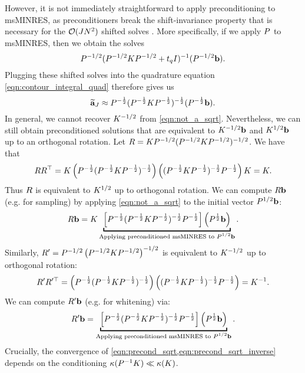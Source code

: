However, it is not immediately straightforward to apply preconditioning to msMINRES, as preconditioners break the shift-invariance property that is necessary for the $\bigo{JN^2}$ shifted solves \cite{jegerlehner1996krylov,aune2013iterative}.
More specifically, if we apply $P$ to msMINRES, then we obtain the solves
%
\[
	P^{-1 / 2} (P^{-1 / 2} K P^{-1 / 2} + t_q I)^{-1} (P^{-1 / 2} \mathbf{b}).
\]
%
Plugging these shifted solves into the quadrature equation \cref{eqn:contour_integral_quad} therefore gives us
%
\begin{equation}
	\widetilde {\mathbf{a}}_J \approx P^{-\frac 1 2} (P^{-\frac 1 2} K P^{-\frac 1 2})^{-\frac 1 2} (P^{-\frac 1 2} \mathbf{b}).
  \label{eqn:not_a_sqrt}
\end{equation}
%
In general, we cannot recover $K^{-1/2}$ from \cref{eqn:not_a_sqrt}.
Nevertheless, we can still obtain preconditioned solutions that are equivalent to $K^{-1/2} \mathbf{b}$ and $K^{1/2} \mathbf{b}$ up to an orthogonal rotation.
Let $R = K P^{-1/2} (P^{-1/2} K P^{-1/2})^{-1/2}$.
We have that
%
\begin{align*}
  R R^\top
	=
	K \left( P^{-\frac 1 2} (P^{-\frac 1 2} K P^{-\frac 1 2})^{-\frac 1 2} \right)
	\left( (P^{-\frac 1 2} K P^{-\frac 1 2})^{-\frac 1 2} P^{-\frac 1 2} \right) K
  = K.
\end{align*}
%
Thus $ R $ is equivalent to $K^{1/2}$ up to orthogonal rotation.
We can compute $R \mathbf{b}$ (e.g. for sampling) by applying \cref{eqn:not_a_sqrt} to the initial vector $P^{1/2} \mathbf{b}$:
%
\begin{align}
  \bR \bb
  =
  \bK
  \underbracket{%
    \Bigl[ \bP^{-\frac 1 2} (\bP^{-\frac 1 2} \bK \bP^{-\frac 1 2})^{-\frac 1 2} \bP^{-\frac 1 2} \Bigr]
    \left( \bP^{\frac 1 2} \bb \right)
  }_{\text{Applying preconditioned msMINRES to $\bP^{1/2} \bb$}}.
  \label{eqn:precond_sqrt}
\end{align}
%
Similarly, $R' = P^{-1/2} \left( P^{-1/2} K P^{-1/2} \right)^{-1/2}$ is equivalent to $K^{-1/2}$ up to orthogonal rotation:
\begin{align*}
  R' R'^\top
	=
	\left( P^{-\frac 1 2} (P^{-\frac 1 2} K P^{-\frac 1 2})^{-\frac 1 2} \right)
	\left( (P^{-\frac 1 2} K P^{-\frac 1 2})^{-\frac 1 2} P^{-\frac 1 2} \right)
  = K^{-1}.
\end{align*}
We can compute $R' \mathbf{b}$ (e.g. for whitening) via:
%
\begin{align}
  \bR' \bb
  =
  \underbracket{%
    \Bigl[ \bP^{-\frac 1 2} (\bP^{-\frac 1 2} \bK \bP^{-\frac 1 2})^{-\frac 1 2} \bP^{-\frac 1 2} \Bigr]
    \left( \bP^{\frac 1 2} \bb \right)
  }_{\text{Applying preconditioned msMINRES to $\bP^{1/2} \bb$}}.
  \label{eqn:precond_sqrt_inverse}
\end{align}
%
Crucially, the convergence of \cref{eqn:precond_sqrt,eqn:precond_sqrt_inverse} depends on the conditioning $\kappa(P^{-1} K) \ll \kappa(K)$.

